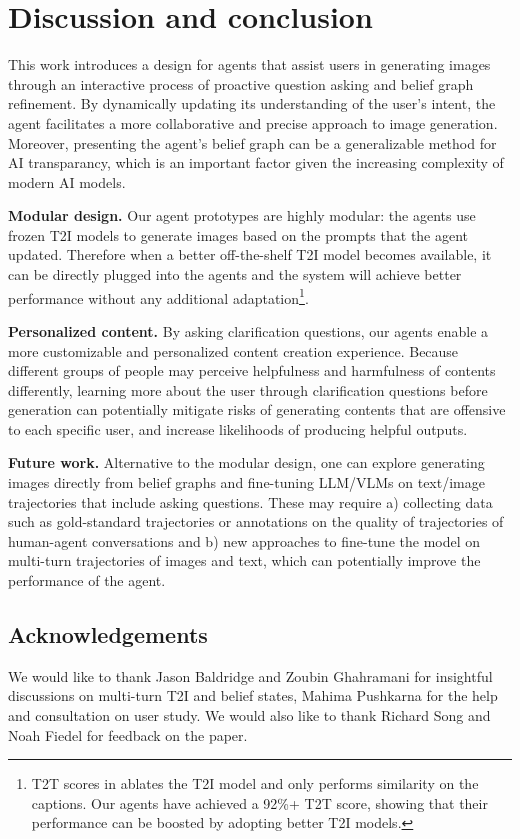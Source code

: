 \section{Discussion and conclusion}
\label{sec:discussion}

This work introduces a design for agents that assist users in generating images through an interactive process of proactive question asking and belief graph refinement. By dynamically updating its understanding of the user's intent, the agent facilitates a more collaborative and precise approach to image generation. Moreover, presenting the agent's belief graph can be a generalizable method for AI transparancy, which is an important factor given the increasing complexity of modern AI models. 

\textbf{Modular design.}  Our agent prototypes are highly modular: the agents use frozen T2I models to generate images based on the prompts that the agent updated. Therefore when a better off-the-shelf T2I model becomes available, it can be directly plugged into the agents and the system will achieve better performance without any additional adaptation\footnote{T2T scores in  ablates the T2I model and only performs similarity on the captions. Our agents have achieved a 92\%+ T2T score, showing that their performance can be boosted by adopting better T2I models.}.  

\textbf{Personalized content.} By asking clarification questions, our agents enable a more customizable and personalized content creation experience. Because different groups of people may perceive helpfulness and harmfulness of contents differently, learning more about the user through clarification questions before generation can potentially mitigate risks of generating contents that are offensive to each specific user, and increase likelihoods of producing helpful outputs.


\textbf{Future work.} Alternative to the modular design, one can explore generating images directly from belief graphs and fine-tuning  LLM/VLMs on text/image trajectories that include asking questions. These may require a) collecting data such as gold-standard trajectories or annotations on the quality of trajectories of human-agent conversations and b) new approaches to fine-tune the model on multi-turn trajectories of images and text, which can potentially improve the performance of the agent.










\subsection*{Acknowledgements}
We would like to thank Jason Baldridge and Zoubin Ghahramani for insightful discussions on multi-turn T2I and belief states, Mahima Pushkarna for the help and consultation on user study. We would also like to thank Richard Song and Noah Fiedel for feedback on the paper.
